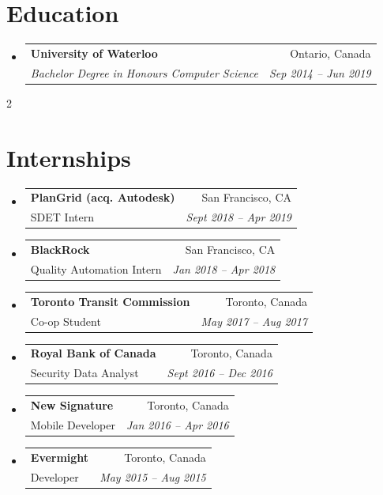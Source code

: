 \documentclass[letterpaper,11pt]{article}
\makeatletter
\newcommand{\resumeItem}[1]{
  \item\small{
    {#1 \vspace{-2pt}}
  }
}
\newcommand{\resumeUniversitySubheading}[4]{
  \vspace{-2pt}\item
    \begin{tabular*}{0.97\textwidth}[t]{l@{\extracolsep{\fill}}r}
      \textbf{#1} & \small{#4} \\
      \textit{\small#3} & \textit{\small#2} \\
    \end{tabular*}\vspace{-7pt}
}
\newcommand{\resumeInternshipSubheading}[4]{
  \vspace{-2pt}\item
    \begin{tabular*}{0.47\textwidth}[t]{l@{\extracolsep{\fill}}r}
      \small\textbf{#1} & \small#4 \\
      \small\small#3 & \textit{\small #2} \\
    \end{tabular*}\vspace{-7pt}
}
\newcommand{\resumeSubHeadingListStart}{\begin{itemize}[leftmargin=0.15in, label={}]}
\newcommand{\resumeSubHeadingListEnd}{\end{itemize}}
\newcommand{\resumeItemListStart}{\begin{itemize}}
\newcommand{\resumeItemListEnd}{\end{itemize}\vspace{-5pt}}
\makeatother
\begin{document}
\section{Education}
  \resumeSubHeadingListStart
    \resumeUniversitySubheading
      {University of Waterloo}{Sep 2014 -- Jun 2019}
      {Bachelor Degree in Honours Computer Science}{Ontario, Canada}
  \resumeSubHeadingListEnd

\begin{multicols*}{2}
    \section{Internships}
    \resumeSubHeadingListStart
    \resumeInternshipSubheading
      {PlanGrid (acq. Autodesk)}{Sept 2018 -- Apr 2019}
      {SDET Intern}{San Francisco, CA}
    \resumeInternshipSubheading
      {BlackRock}{Jan 2018 -- Apr 2018}
      {Quality Automation Intern}{San Francisco, CA}

    \resumeInternshipSubheading
      {Toronto Transit Commission}{May 2017 -- Aug 2017}
      {Co-op Student}{Toronto, Canada}
    \resumeInternshipSubheading
      {Royal Bank of Canada}{Sept 2016 -- Dec 2016}
      {Security Data Analyst}{Toronto, Canada}
    \resumeInternshipSubheading
      {New Signature}{Jan 2016 -- Apr 2016}
      {Mobile Developer}{Toronto, Canada}

    \resumeInternshipSubheading
      {Evermight}{May 2015 -- Aug 2015}
      {Developer}{Toronto, Canada}
  \resumeSubHeadingListEnd
  \columnbreak


\end{multicols*}
\end{document}
